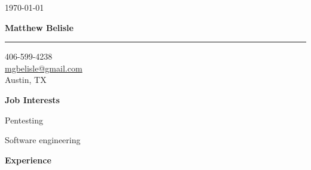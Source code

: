 \documentclass[10pt, a4paper]{article}
\begin{document}
\thispagestyle{empty}
\begin{flushright}
\small \today
\end{flushright}
\begin{center}
\textbf{\Large Matthew Belisle}
\rule{\linewidth}{0.5mm}
\end{center}
\begin{flushright}
\begin{minipage}[h]{0.25\linewidth}\small
\begin{flushleft}
406-599-4238\\
\href{mailto:mgbelisle@gmail.com}{mgbelisle@gmail.com}\\
Austin, TX
\end{flushleft}
\end{minipage}
\end{flushright}
\textbf{Job Interests}
\begin{itemize*}
  \item Pentesting
  \item Software engineering
\end{itemize*}
\textbf{Experience}
\end{document}
